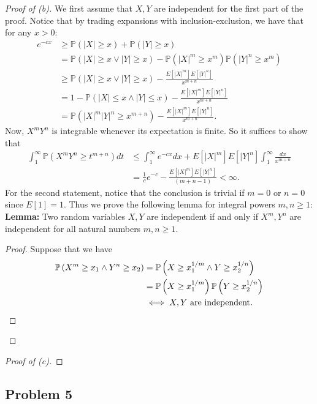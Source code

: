 \documentclass[12pt,reqno]{article}
\theoremstyle{plain}
\theoremstyle{definition}
\newcommand{\PP}[1]{\ensuremath{\mathbb{P}\left(#1\right)}}
\begin{document}
\begin{proof}[Proof of (b)] 
We first assume that $X,Y$ are independent for the first part of the proof. 
Notice that by trading expansions with inclusion-exclusion, we have that 
for any $x > 0$:
\begin{align*} 
e^{-cx} & \geq \PP{|X| \geq x} + \PP{|Y| \geq x} \\ 
     & = \PP{|X| \geq x \vee |Y| \geq x} - 
     \PP{|X|^m \geq x^m} \PP{|Y|^n \geq x^m} \\ 
     & \geq \PP{|X| \geq x \vee |Y| \geq x} - 
     \frac{E[|X|^m] E[|Y|^n]}{x^{m+n}} \\ 
     & = 1 - \PP{|X| \leq x \wedge |Y| \leq x} - 
     \frac{E[|X|^m] E[|Y|^n]}{x^{m+n}} \\ 
     & = \PP{|X|^m |Y|^n \geq x^{m+n}} - 
     \frac{E[|X|^m] E[|Y|^n]}{x^{m+n}}. 
\end{align*} 
Now, $X^mY^n$ is integrable whenever its expectation is finite. So it 
suffices to show that 
\begin{align*} 
\int_1^{\infty} \PP{X^mY^n \geq t^{m+n}} dt & \leq 
     \int_1^{\infty} e^{-cx} dx 
     + E[|X|^m] E[|Y|^n] \int_1^{\infty} \frac{dx}{x^{m+n}} \\ 
     & = \frac{1}{c} e^{-c} - \frac{E[|X|^m] E[|Y|^n]}{(m+n-1)} < \infty. 
\end{align*} 
For the second statement, notice that the conclusion is trivial if 
$m=0$ or $n = 0$ since $E[1] = 1$. Thus we prove the following lemma 
for integral powers $m,n \geq 1$: \\ 
\noindent 
\textbf{Lemma:} 
Two random variables $X,Y$ are independent if and only if $X^m,Y^n$ are 
independent for all natural numbers $m,n \geq 1$. 
\begin{proof} 
Suppose that we have 
\begin{align*} 
\PP{X^m \geq x_1 \wedge Y^n \geq x_2} & = 
     \PP{X \geq x_1^{1/m} \wedge Y \geq x_2^{1/n}} \\ 
     & = \PP{X \geq x_1^{1/m}} \PP{Y \geq x_2^{1/n}} \\ 
     & \iff X,Y \text{ are independent. } 
     \qedhere
\end{align*} 
\end{proof} 
\end{proof} 
\begin{proof}[Proof of (c)]
\end{proof} 

\subsection{Problem 5}
\end{document}
